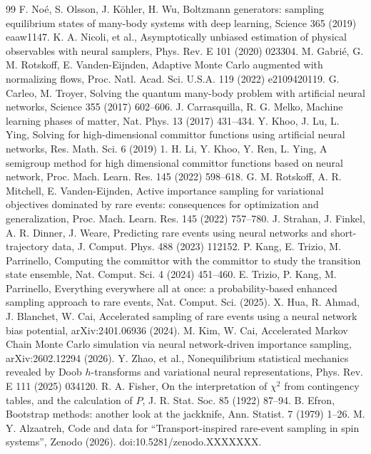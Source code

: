 \documentclass[a4paper,fleqn]{cas-sc}
\begin{document}
\begin{thebibliography}{99}
 F. No\'e, S. Olsson, J. K\"ohler, H. Wu, Boltzmann generators: sampling
equilibrium states of many-body systems with deep learning, Science 365 (2019) eaaw1147.
 K. A. Nicoli, et al., Asymptotically unbiased estimation of physical
observables with neural samplers, Phys. Rev. E 101 (2020) 023304.
 M. Gabri\'e, G. M. Rotskoff, E. Vanden-Eijnden, Adaptive Monte Carlo augmented
with normalizing flows, Proc. Natl. Acad. Sci. U.S.A. 119 (2022) e2109420119.
 G. Carleo, M. Troyer, Solving the quantum many-body problem with artificial
neural networks, Science 355 (2017) 602--606.
 J. Carrasquilla, R. G. Melko, Machine learning phases of matter,
Nat. Phys. 13 (2017) 431--434.
 Y. Khoo, J. Lu, L. Ying, Solving for high-dimensional committor functions using
artificial neural networks, Res. Math. Sci. 6 (2019) 1.
 H. Li, Y. Khoo, Y. Ren, L. Ying, A semigroup method for high dimensional committor
functions based on neural network, Proc. Mach. Learn. Res. 145 (2022) 598--618.
 G. M. Rotskoff, A. R. Mitchell, E. Vanden-Eijnden, Active importance
sampling for variational objectives dominated by rare events: consequences for optimization and
generalization, Proc. Mach. Learn. Res. 145 (2022) 757--780.
 J. Strahan, J. Finkel, A. R. Dinner, J. Weare, Predicting rare events using
neural networks and short-trajectory data, J. Comput. Phys. 488 (2023) 112152.
 P. Kang, E. Trizio, M. Parrinello, Computing the committor with the committor to
study the transition state ensemble, Nat. Comput. Sci. 4 (2024) 451--460.
 E. Trizio, P. Kang, M. Parrinello, Everything everywhere all at once: a
probability-based enhanced sampling approach to rare events, Nat. Comput. Sci. (2025).
 X. Hua, R. Ahmad, J. Blanchet, W. Cai, Accelerated sampling of rare events using
a neural network bias potential, arXiv:2401.06936 (2024).
 M. Kim, W. Cai, Accelerated Markov Chain Monte Carlo simulation via neural
network-driven importance sampling, arXiv:2602.12294 (2026).
 Y. Zhao, et al., Nonequilibrium statistical mechanics revealed by Doob
$h$-transforms and variational neural representations, Phys. Rev. E 111 (2025) 034120.
 R. A. Fisher, On the interpretation of $\chi^2$ from contingency tables,
and the calculation of $P$, J. R. Stat. Soc. 85 (1922) 87--94.
 B. Efron, Bootstrap methods: another look at the jackknife, Ann. Statist.
7 (1979) 1--26.
 M. Y. Alzaatreh, Code and data for ``Transport-inspired rare-event sampling in
spin systems'', Zenodo (2026). doi:10.5281/zenodo.XXXXXXX.

\end{thebibliography}
\end{document}

